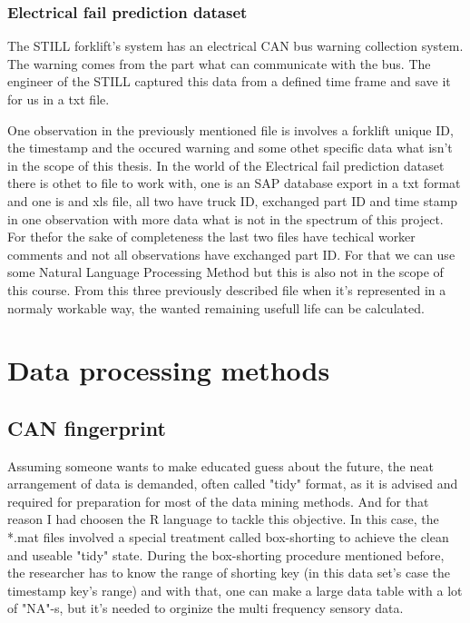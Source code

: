 			\subsubsection{Electrical fail prediction dataset}
\noindent
The STILL forklift's system has an electrical CAN bus warning collection system. The warning comes from the part what can communicate with the bus. The engineer of the STILL captured this data from a defined time frame and save it for us in a txt file. 

\noindent
One observation in the previously mentioned file is involves a forklift unique ID, the timestamp and the occured warning and some othet specific data what isn't in the scope of this thesis.
\noindent
In the world of the Electrical fail prediction dataset there is othet to file to work with, one is an SAP database export in a txt format and one is and xls file, all two have truck ID, exchanged part ID and time stamp in one observation with more data what is not in the spectrum of this project.
\noindent
For thefor the sake of completeness the last two files have techical worker comments and not all observations have exchanged part ID. For that we can use some Natural Language Processing Method but this is also not in the scope of this course.
\noindent
From this three previously described file when it's represented in a normaly workable way, the wanted remaining usefull life can be calculated.
	\section{Data processing methods}
		\subsection{CAN fingerprint}
				\noindent
Assuming someone wants to make educated guess about the future, the neat arrangement of data is demanded, often called "tidy" format, as it is advised and required for preparation for most of the data mining methods. And for that reason I had choosen the R language to tackle this objective.
				\noindent
In this case, the *.mat files involved a special treatment called box-shorting to achieve the clean and useable "tidy" state. During the box-shorting procedure mentioned before, the researcher has to know the range of shorting key (in this data set's case the timestamp key's range) and with that, one can make a large data table with a lot of "NA"-s, but it's needed to orginize the multi frequency sensory data.

